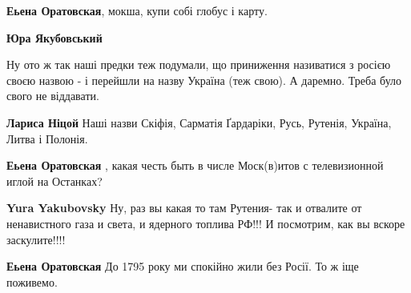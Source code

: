 \begin{itemize}
\begin{itemize}
\begin{itemize}
\textbf{Еьена Оратовская}, мокша, купи собі глобус і карту.


 
\textbf{Юра Якубовський} 

Ну ото ж так наші предки теж подумали, що приниження
називатися з росією своєю назвою - і перейшли на назву Україна (теж свою). А
даремно. Треба було свого не віддавати.

 
\textbf{Лариса Ніцой} Наші назви Скіфія, Сарматія Ґардаріки, Русь, Рутенія, Україна, Литва і Полонія.

 
\textbf{Еьена Оратовская} , какая честь быть в числе Моск(в)итов с телевизионной иглой на Останках?
\end{itemize}

 
\textbf{Yura Yakubovsky} Ну, раз вы какая то там Рутения- так и отвалите от
ненавистного газа и света, и ядерного топлива РФ!!! И посмотрим, как вы вскоре
заскулите!!!!

\begin{itemize}
 
\textbf{Еьена Оратовская} До 1795 року ми спокійно жили без Росії. То ж іще поживемо.



\end{itemize}
\end{itemize}
\end{itemize}
